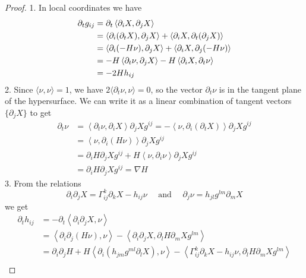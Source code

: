 \begin{proof}
1. In local coordinates we have 
\begin{align*}
    \partial_tg_{ij} & = \partial_{t} \left\langle \partial_{i}X, \partial_{j}X \right\rangle \\
& = \left\langle \partial_{i}(\partial_{t}X), \partial_{j}X \right\rangle + \left\langle \partial_{i}X, \partial_{t}(\partial_{j}X) \right\rangle\\
& = \left\langle \partial_{i}(-H \nu), \partial_{j}X \right\rangle + \left\langle \partial_{i}X, \partial_{j}(-H \nu)\right\rangle \\
& = -H \left\langle \partial_{t} \nu, \partial_{j}X\right\rangle  - H \left\langle \partial_{i}X, \partial_{t}\nu\right\rangle \\
& = -2Hh_{ij}
\end{align*}
2. Since $\langle \nu, \nu \rangle = 1$, we have $2\langle \partial_{t}\nu, \nu \rangle = 0$, so the vector $\partial_{t}\nu$ is in the tangent plane of the hypersurface. We can write it as a linear combination of tangent vectors $\{\partial_{j}X\}$ to get
\begin{align*}
\partial_{t}\nu &= \left\langle \partial_{t}\nu, \partial_{i}X \right\rangle \partial_{j}Xg^{ij} = - \left\langle \nu, \partial_{i}\left( \partial_{t}X \right) \right\rangle\partial_{j}X g^{ij} \\
& = \left\langle \nu, \partial_{i}\left( H \nu \right) \right\rangle \partial_{j}Xg^{ij}\\
& = \partial_{i}H \partial_{j}X g^{ij} + H \left\langle \nu, \partial_{i}\nu\right\rangle \partial_{j}Xg^{ij}\\
& = \partial_{i}H\partial_{j}Xg^{ij} = \nabla H
\end{align*}
3. From the relations \[
\partial_{i}\partial_{j}X = \Gamma^{k}_{ij}\partial_{k}X	-h_{ij}\nu \quad \text{ and } \quad\partial_{j}\nu = h_{jl}g^{lm}\partial_{m}X\] we get 
\begin{align*}
\partial_{t} h_{ij} & = - \partial_{t} \left\langle\partial_{i}\partial_{j}X ,\nu\right\rangle\\
& = \left\langle\partial_{i}\partial_{j}(H \nu), \nu \right\rangle - \left\langle \partial_{i}\partial_{j}X, \partial_{l}H \partial_{m}Xg^{lm}\right\rangle \\
& = \partial_{i}\partial_{j}H + H \left\langle \partial_{i}\left( h_{jm}g^{ml} \partial_{l}X \right), \nu \right\rangle -\left< \Gamma_{ij}^{k}\partial_{k}X-h_{ij}\nu,\partial_{l}H \partial_{m}Xg^{lm} \right>\\

\end{align*}
\end{proof}
